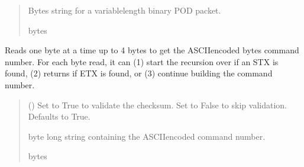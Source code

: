 \documentclass[letterpaper,10pt,english]{sphinxmanual}
\begin{document}
\begin{fulllineitems}
\begin{fulllineitems}
\begin{quote}
\begin{description}
\sphinxAtStartPar
Bytes string for a variable\sphinxhyphen{}length binary POD packet.

\sphinxAtStartPar
bytes

\end{description}\end{quote}

\end{fulllineitems}


\begin{fulllineitems}
\label{\detokenize{BasicPodProtocol:BasicPodProtocol.POD_Basics._Read_GetCommand}}
\pysigstartsignatures
{}
\pysigstopsignatures
\sphinxAtStartPar
Reads one byte at a time up to 4 bytes to get the ASCII\sphinxhyphen{}encoded bytes command number. For each         byte read, it can (1) start the recursion over if an STX is found, (2) returns if ETX is found, or         (3) continue building the command number.
\begin{quote}\begin{description}
\sphinxAtStartPar
{} (\sphinxstyleliteralemphasis{\sphinxupquote{, }}) \textendash{} Set to True to validate the checksum. Set to False to skip                 validation. Defaults to True.

 byte long string containing the ASCII\sphinxhyphen{}encoded command number.

\sphinxAtStartPar
bytes

\end{description}\end{quote}

\end{fulllineitems}



\end{fulllineitems}
\end{document}
